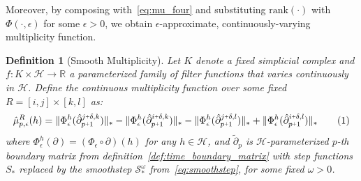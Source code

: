 \documentclass[10pt]{article}
\numberwithin{equation}{section}
\newcommand{\+}{%
	\raisebox{0.18ex}{\scaleobj{0.55}{+}}
}
\newtheorem{definition}{Definition}
\theoremstyle{definition}
\newcommand\numberthis{\addtocounter{equation}{1}\tag{\theequation}}
\begin{document}
Moreover, by composing with~\eqref{eq:mu_four} and substituting $\mathrm{rank}(\cdot)$ with $\Phi(\cdot, \epsilon)$ for some $\epsilon > 0$, we obtain $\epsilon$-approximate, continuously-varying multiplicity function. 
\begin{definition}[Smooth Multiplicity]\label{def:smooth_mu}
Let $K$ denote a fixed simplicial complex and $f: K \times \mathcal{H} \to \mathbb{R}$ a parameterized family of filter functions that varies continuously in $\mathcal{H}$. Define the \emph{continuous multiplicity function} over some fixed $R = [i,j] \times [k,l]$ as:
	\begin{equation}\label{eq:mu_cont}
	\hat{\mu}_{p,\epsilon}^R(h) = 
		 \lVert \Phi_\epsilon^h(\hat{\partial}_{p\+1}^{j \+ \delta, k}) \rVert_\ast - 
		 \lVert \Phi_\epsilon^h(\hat{\partial}_{p\+1}^{i \+ \delta, k}) \rVert_\ast -  
		 \lVert \Phi_\epsilon^h(\hat{\partial}_{p\+1}^{j \+ \delta, l}) \rVert_\ast + 
		 \lVert \Phi_\epsilon^h(\hat{\partial}_{p\+1}^{i \+ \delta, l}) \rVert_\ast \numberthis
\end{equation}
where $\Phi_\epsilon^h(\partial) = (\Phi_\epsilon \circ \partial)(h)$ for any $h \in \mathcal{H}$, and $\tilde{\partial}_p$ is $\mathcal{H}$-parameterized $p$-th boundary matrix from definition~\ref{def:time_boundary_matrix} with step functions $S_\ast$ replaced by the smoothstep $\mathcal{S}_\ast^\omega$ from~\eqref{eq:smoothstep}, for some fixed $\omega > 0$.
\end{definition}
\end{document}
